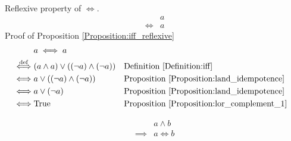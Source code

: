 \begin{prop}
\label{Proposition:iff_reflexive}
Reflexive property of $\iff$.
\begin{align*}
& a \\
\iff & a
\end{align*}
Proof of Proposition \ref{Proposition:iff_reflexive}
\begin{align*}
& a \iff a \\
\overset{\operatorname{def}}{\iff} & (a \land a) \lor ((\lnot a) \land (\lnot a))
& & \text{Definition \ref{Definition:iff}} \\
\iff & a \lor ((\lnot a) \land (\lnot a))
& & \text{Proposition \ref{Proposition:land_idempotence}} \\
\iff & a \lor (\lnot a)
& & \text{Proposition \ref{Proposition:land_idempotence}} \\
\iff & \text{True}
& & \text{Proposition \ref{Proposition:lor_complement_1}} \\
\end{align*}
\end{prop}

\begin{prop}
\label{Proposition:land_implies_iff}
\begin{align*}
& a \land b \\
\implies & a \iff b
\end{align*}
\end{prop}

